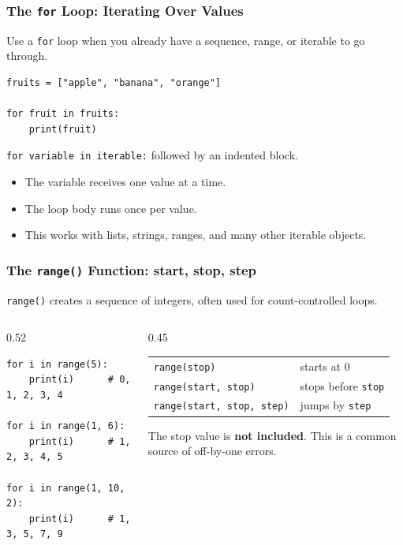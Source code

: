 \documentclass[aspectratio=169,10pt]{beamer}
\newcommand{\myitem}[1]{\item #1\vspace{0.04cm}}
\begin{document}
\begin{frame}[fragile]
\frametitle{The \texttt{for} Loop: Iterating Over Values}
Use a \texttt{for} loop when you already have a sequence, range, or iterable to go through.

\begin{lstlisting}[style=pycode]
fruits = ["apple", "banana", "orange"]

for fruit in fruits:
    print(fruit)
\end{lstlisting}

\begin{tcolorbox}[lecturebox,title=Structure]
\texttt{for variable in iterable:} \quad followed by an indented block.
\end{tcolorbox}

\begin{itemize}\setlength\itemsep{0.03cm}
  \myitem{The variable receives one value at a time.}
  \myitem{The loop body runs once per value.}
  \myitem{This works with lists, strings, ranges, and many other iterable objects.}
\end{itemize}
\end{frame}


\begin{frame}[fragile]
\frametitle{The \texttt{range()} Function: start, stop, step}
\texttt{range()} creates a sequence of integers, often used for count-controlled loops.

\begin{columns}[T,totalwidth=\textwidth]
\begin{column}{0.52\textwidth}
\begin{lstlisting}[style=pycode]
for i in range(5):
    print(i)      # 0, 1, 2, 3, 4

for i in range(1, 6):
    print(i)      # 1, 2, 3, 4, 5

for i in range(1, 10, 2):
    print(i)      # 1, 3, 5, 7, 9
\end{lstlisting}
\end{column}
\begin{column}{0.45\textwidth}
\begin{tcolorbox}[lecturebox,title=Remember]
\scriptsize
\begin{tabular}{@{}ll@{}}
\texttt{range(stop)} & starts at 0 \\
\texttt{range(start, stop)} & stops before \texttt{stop} \\
\texttt{range(start, stop, step)} & jumps by \texttt{step}
\end{tabular}
\end{tcolorbox}
\begin{tcolorbox}[lecturebox,title=Common trap]
The stop value is \textbf{not included}. This is a common source of off-by-one errors.
\end{tcolorbox}
\end{column}
\end{columns}
\end{frame}
\end{document}
